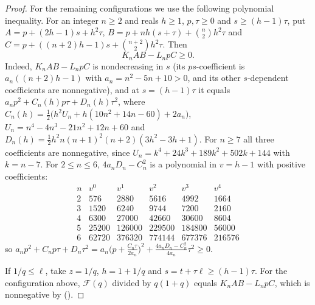 \documentclass[twoside,10pt]{article}
\numberwithin{equation}{section}
\theoremstyle{slbody}
\theoremstyle{definition}
\theoremstyle{remark}
\renewcommand{\eqref}[1]{\textup{{\normalfont(\oldstylenums{\ref{#1}}}\normalfont)}}
\begin{document}
\begin{proof}
For the remaining configurations we use the following polynomial inequality. For an integer $n\geq2$ and reals $h\geq1$, $p,\tau\geq0$ and $s\geq(h-1)\tau$, put $A=p+(2h-1)s+h^2\tau$, $B=p+nh(s+\tau)+\binom n2h^2\tau$ and $C=p+((n+2)h-1)s+\binom{n+2}2h^2\tau$. Then
\begin{equation}\label{eq:quad-cert}
K_nAB-L_npC\geq0.
\end{equation}
Indeed, $K_nAB-L_npC$ is nondecreasing in $s$ (its $ps$-coefficient is $a_n((n+2)h-1)$ with $a_n=n^2-5n+10>0$, and its other $s$-dependent coefficients are nonnegative), and at $s=(h-1)\tau$ it equals $a_np^2+C_n(h)p\tau+D_n(h)\tau^2$, where $C_n(h)=\frac12\bigl(h^2U_n+h(10n^2+14n-60)+2a_n\bigr)$, $U_n=n^4-4n^3-21n^2+12n+60$ and $D_n(h)=\frac12h^2n(n+1)^2(n+2)(3h^2-3h+1)$. For $n\geq7$ all three coefficients are nonnegative, since $U_n=k^4+24k^3+189k^2+502k+144$ with $k=n-7$. For $2\leq n\leq6$, $4a_nD_n-C_n^2$ is a polynomial in $v=h-1$ with positive coefficients:
\[
\begin{array}{c|ccccc}
n&v^0&v^1&v^2&v^3&v^4\\\hline
2&576&2880&5616&4992&1664\\
3&1520&6240&9744&7200&2160\\
4&6300&27000&42660&30600&8604\\
5&25200&126000&229500&184800&56000\\
6&62720&376320&774144&677376&216576
\end{array}
\]
so $a_np^2+C_np\tau+D_n\tau^2=a_n\bigl(p+\frac{C_n\tau}{2a_n}\bigr)^2+\frac{4a_nD_n-C_n^2}{4a_n}\tau^2\geq0$.

If $1/q\leq\ell$, take $z=1/q$, $h=1+1/q$ and $s=t+\tau\ell\geq(h-1)\tau$. For the configuration above, $\mathcal F(q)$ divided by $q(1+q)$ equals $K_nAB-L_npC$, which is nonnegative by \eqref{eq:quad-cert}.


\end{proof}
\end{document}
